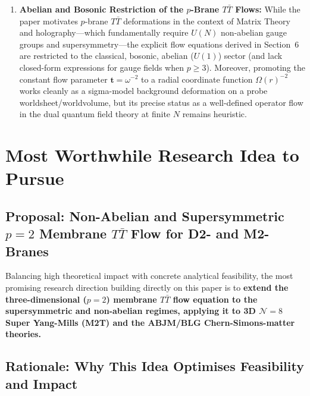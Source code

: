 \documentclass[11pt,a4paper]{article}
\begin{document}
\begin{enumerate}
    \item \textbf{Abelian and Bosonic Restriction of the $p$-Brane $T\bar{T}$ Flows:} While the paper motivates $p$-brane $T\bar{T}$ deformations in the context of Matrix Theory and holography---which fundamentally require $U(N)$ non-abelian gauge groups and supersymmetry---the explicit flow equations derived in Section~6 are restricted to the classical, bosonic, abelian ($U(1)$) sector (and lack closed-form expressions for gauge fields when $p \ge 3$). Moreover, promoting the constant flow parameter $\boldsymbol{t} = \omega^{-2}$ to a radial coordinate function $\Omega(r)^{-2}$ works cleanly as a sigma-model background deformation on a probe worldsheet/worldvolume, but its precise status as a well-defined operator flow in the dual quantum field theory at finite $N$ remains heuristic.
\end{enumerate}

\section{Most Worthwhile Research Idea to Pursue}

\subsection*{Proposal: Non-Abelian and Supersymmetric $p=2$ Membrane $T\bar{T}$ Flow for D2- and M2-Branes}

Balancing high theoretical impact with concrete analytical feasibility, the most promising research direction building directly on this paper is to \textbf{extend the three-dimensional ($p=2$) membrane $T\bar{T}$ flow equation to the supersymmetric and non-abelian regimes, applying it to 3D $\mathcal{N}=8$ Super Yang-Mills (M2T) and the ABJM/BLG Chern-Simons-matter theories.}

\subsection*{Rationale: Why This Idea Optimises Feasibility and Impact}
\end{document}
